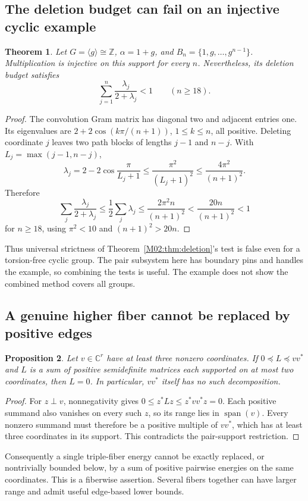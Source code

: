 \documentclass[11pt,a4paper,oneside]{report}
\newtheorem{theorem}{Theorem}[section]
\newtheorem{proposition}[theorem]{Proposition}
\theoremstyle{definition}
\theoremstyle{remark}
\newcommand{\C}{\mathbb C}
\newcommand{\Z}{\mathbb Z}
\begin{document}
\subsection{The deletion budget can fail on an injective cyclic example}
\begin{theorem}\label{M02:thm:budgetbarrier}
Let \(G=\langle g\rangle\cong\Z\), \(\alpha=1+g\), and \(B_n=\{1,g,\ldots,g^{n-1}\}\). Multiplication is injective on this support for every \(n\). Nevertheless, its deletion budget satisfies
\[
\sum_{j=1}^n\frac{\lambda_j}{2+\lambda_j}<1
\qquad(n\ge18).
\]
\end{theorem}
\begin{proof}
The convolution Gram matrix has diagonal two and adjacent entries one. Its eigenvalues are \(2+2\cos(k\pi/(n+1))\), \(1\le k\le n\), all positive. Deleting coordinate \(j\) leaves two path blocks of lengths \(j-1\) and \(n-j\). With \(L_j=\max(j-1,n-j)\),
\[
\lambda_j=2-2\cos\frac{\pi}{L_j+1}
\le\frac{\pi^2}{(L_j+1)^2}
\le\frac{4\pi^2}{(n+1)^2}.
\]
Therefore
\[
\sum_j\frac{\lambda_j}{2+\lambda_j}
\le\frac12\sum_j\lambda_j
\le\frac{2\pi^2n}{(n+1)^2}
<\frac{20n}{(n+1)^2}<1
\]
for \(n\ge18\), using \(\pi^2<10\) and \((n+1)^2>20n\).
\end{proof}
Thus universal strictness of Theorem~\ref{M02:thm:deletion}'s test is false even for a torsion-free cyclic group. The pair subsystem here has boundary pins and handles the example, so combining the tests is useful. The example does not show the combined method covers all groups.

\subsection{A genuine higher fiber cannot be replaced by positive edges}
\begin{proposition}\label{M02:prop:rankone}
Let \(v\in\C^r\) have at least three nonzero coordinates. If \(0\preceq L\preceq vv^*\) and \(L\) is a sum of positive semidefinite matrices each supported on at most two coordinates, then \(L=0\). In particular, \(vv^*\) itself has no such decomposition.
\end{proposition}
\begin{proof}
For \(z\perp v\), nonnegativity gives \(0\le z^*Lz\le z^*vv^*z=0\). Each positive summand also vanishes on every such \(z\), so its range lies in \(\operatorname{span}(v)\). Every nonzero summand must therefore be a positive multiple of \(vv^*\), which has at least three coordinates in its support. This contradicts the pair-support restriction.
\end{proof}
Consequently a single triple-fiber energy cannot be exactly replaced, or nontrivially bounded below, by a sum of positive pairwise energies on the same coordinates. This is a fiberwise assertion. Several fibers together can have larger range and admit useful edge-based lower bounds.
\end{document}
